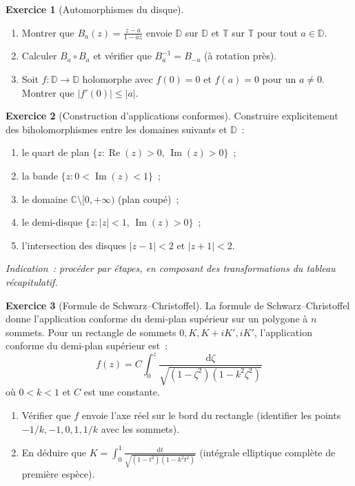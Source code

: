 \documentclass[12pt,a4paper,openany]{book}
\theoremstyle{definition}
\newtheorem{exercice}{Exercice}[chapter]
\theoremstyle{plain}
\theoremstyle{remark}
\newcommand{\C}{\mathbb{C}}
\newcommand{\D}{\mathbb{D}}
\newcommand{\T}{\mathbb{T}}
\DeclareMathOperator{\re}{Re}
\DeclareMathOperator{\im}{Im}
\newcommand{\dd}{\mathrm{d}}
\newcommand{\abs}[1]{\left|#1\right|}
\newcommand{\conj}[1]{\overline{#1}}
\begin{document}
\begin{exercice}[Automorphismes du disque]\label{exo:auto-disque}
\begin{enumerate}[label=\alph*)]
  \item Montrer que $B_a(z) = \frac{z-a}{1-\conj{a}z}$ envoie $\D$ sur $\D$
    et $\T$ sur $\T$ pour tout $a \in \D$.
  \item Calculer $B_a \circ B_a$ et vérifier que $B_a^{-1} = B_{-a}$
    (à rotation près).
  \item Soit $f \colon \D \to \D$ holomorphe avec $f(0) = 0$ et $f(a) = 0$
    pour un $a \neq 0$. Montrer que $\abs{f'(0)} \leq \abs{a}$.
\end{enumerate}
\end{exercice}

\begin{exercice}[Construction d'applications conformes]\label{exo:construction-conforme}
Construire explicitement des biholomorphismes entre les domaines suivants et $\D$~:
\begin{enumerate}[label=\alph*)]
  \item le quart de plan $\{z : \re(z) > 0,\, \im(z) > 0\}$~;
  \item la bande $\{z : 0 < \im(z) < 1\}$~;
  \item le domaine $\C \setminus [0, +\infty)$ (plan coupé)~;
  \item le demi-disque $\{z : \abs{z} < 1,\, \im(z) > 0\}$~;
  \item l'intersection des disques $\abs{z-1} < 2$ et $\abs{z+1} < 2$.
\end{enumerate}
\emph{Indication~: procéder par étapes, en composant des transformations du
tableau récapitulatif.}
\end{exercice}

\begin{exercice}[Formule de Schwarz--Christoffel]\label{exo:schwarz-christoffel}
La formule de Schwarz--Christoffel donne l'application conforme du demi-plan
supérieur sur un polygone à $n$ sommets. Pour un rectangle de sommets
$0, K, K+iK', iK'$, l'application conforme du demi-plan supérieur est~:
\[
  f(z) = C \int_0^z \frac{\dd\zeta}{\sqrt{(1-\zeta^2)(1-k^2\zeta^2)}}
\]
où $0 < k < 1$ et $C$ est une constante.
\begin{enumerate}[label=\alph*)]
  \item Vérifier que $f$ envoie l'axe réel sur le bord du rectangle
    (identifier les points $-1/k, -1, 0, 1, 1/k$ avec les sommets).
  \item En déduire que $K = \int_0^1 \frac{\dd t}{\sqrt{(1-t^2)(1-k^2t^2)}}$
    (intégrale elliptique complète de première espèce).
\end{enumerate}
\end{exercice}
\end{document}

